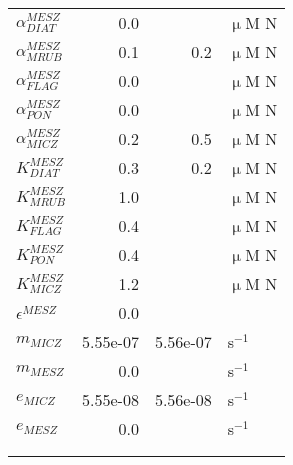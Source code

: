\begin{tabular}{lrrl}
     $\alpha_{DIAT}^{MESZ}$ & 0.0 &   & $\upmu$M N \\
     $\alpha_{MRUB}^{MESZ}$ & 0.1 & 0.2 & $\upmu$M N \\
     $\alpha_{FLAG}^{MESZ}$ & 0.0 &   & $\upmu$M N \\
     $\alpha_{PON}^{MESZ}$ & 0.0 &   & $\upmu$M N \\
     $\alpha_{MICZ}^{MESZ}$ & 0.2 & 0.5 & $\upmu$M N \\
     $K_{DIAT}^{MESZ}$ & 0.3 & 0.2 & $\upmu$M N \\
     $K_{MRUB}^{MESZ}$ & 1.0 &   & $\upmu$M N \\
     $K_{FLAG}^{MESZ}$ & 0.4 &   & $\upmu$M N \\
     $K_{PON}^{MESZ}$ & 0.4 &   & $\upmu$M N \\
     $K_{MICZ}^{MESZ}$ & 1.2 &   & $\upmu$M N \\
     $\epsilon^{MESZ}$ & 0.0 &   &  \\
     $m_{MICZ}$ & 5.55e-07 & 5.56e-07 & s$^{-1}$ \\
     $m_{MESZ}$ & 0.0 &   & s$^{-1}$ \\
     $e_{MICZ}$ & 5.55e-08 & 5.56e-08 & s$^{-1}$ \\
     $e_{MESZ}$ & 0.0 &   & s$^{-1}$ \\
   \midrule
 \\ \\   \end{tabular}
